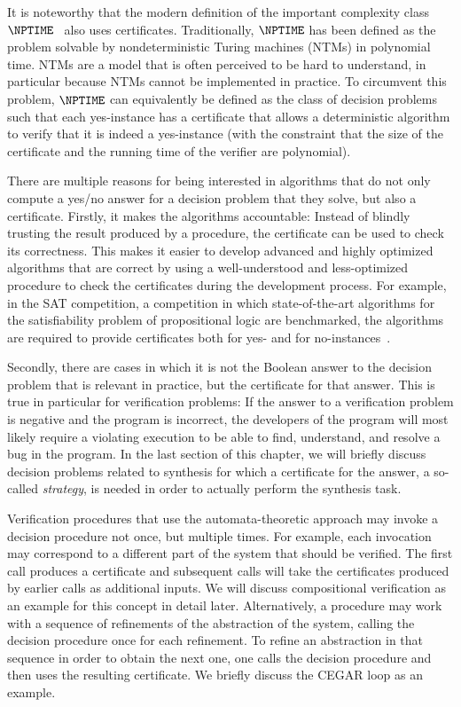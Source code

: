 \documentclass[../../diss.tex]{subfiles}
\begin{document}
It is noteworthy that the modern definition of the important complexity class $\NPTIME$~\cite{Cook00} also uses certificates.
Traditionally, $\NPTIME$ has been defined as the problem solvable by nondeterministic Turing machines (NTMs) in polynomial time.
NTMs are a model that is often perceived to be hard to understand, in particular because NTMs cannot be implemented in practice.
To circumvent this problem, $\NPTIME$ can equivalently be defined as the class of decision problems such that each yes-instance has a certificate that allows a deterministic algorithm to verify that it is indeed a yes-instance (with the constraint that the size of the certificate and the running time of the verifier are polynomial).

There are multiple reasons for being interested in algorithms that do not only compute a yes/no answer for a decision problem that they solve, but also a certificate.
Firstly, it makes the algorithms accountable:
Instead of blindly trusting the result produced by a procedure, the certificate can be used to check its correctness.
This makes it easier to develop advanced and highly optimized algorithms that are correct by using a well-understood and less-optimized procedure to check the certificates during the development process.
For example, in the SAT competition, a competition in which state-of-the-art algorithms for the satisfiability problem of propositional logic are benchmarked, the algorithms are required to provide certificates both for yes- and for no-instances~\cite{Satcomp18}.

Secondly, there are cases in which it is not the Boolean answer to the decision problem that is relevant in practice, but the certificate for that answer.
This is true in particular for verification problems:
If the answer to a verification problem is negative and the program is incorrect, the developers of the program will most likely require a violating execution to be able to find, understand, and resolve a bug in the program.
In the last section of this chapter, we will briefly discuss decision problems related to synthesis for which a certificate for the answer, a so-called \emph{strategy}, is needed in order to actually perform the synthesis task.

Verification procedures that use the automata-theoretic approach may invoke a decision procedure not once, but multiple times.
For example, each invocation may correspond to a different part of the system that should be verified.
The first call produces a certificate and subsequent calls will take the certificates produced by earlier calls as additional inputs.
We will discuss compositional verification as an example for this concept in detail later.
Alternatively, a procedure may work with a sequence of refinements of the abstraction of the system, calling the decision procedure once for each refinement.
To refine an abstraction in that sequence in order to obtain the next one, one calls the decision procedure and then uses the resulting certificate.
We briefly discuss the CEGAR loop as an example.
\end{document}
